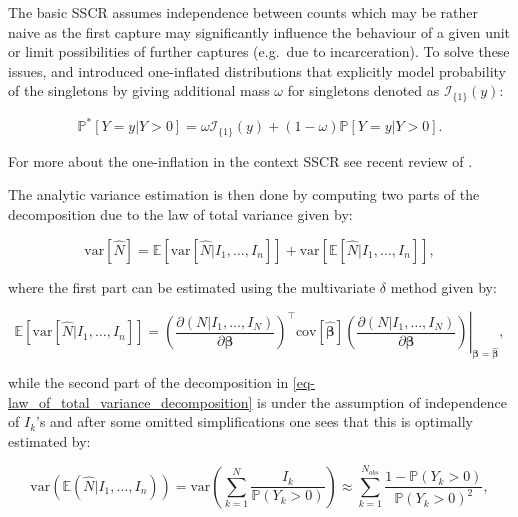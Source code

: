 \documentclass[
]{jss}
\newcommand{\1}{\mathcal{I}} \newcommand{\bZero}{\boldsymbol{0}}
\begin{document}
The basic SSCR assumes independence between counts which may be rather
naive as the first capture may significantly influence the behaviour of
a given unit or limit possibilities of further captures (e.g.~due to
incarceration). To solve these issues, \citet{godwin2017estimation} and
\citet{ztoi-oizt-poisson} introduced one-inflated distributions that
explicitly model probability of the singletons by giving additional mass
\(\omega\) for singletons denoted as \(\mathcal{I}_{\{1\}}(y)\):

\begin{equation*}
  \mathbb{P}^{\ast}[Y=y|Y>0] =
  \omega\mathcal{I}_{\{1\}}(y)+(1-\omega)\mathbb{P}[Y=y|Y>0].
\end{equation*}

For more about the one-inflation in the context SSCR see recent review
of \citet{bohning2024one}.

The analytic variance estimation is then done by computing two parts of
the decomposition due to the law of total variance given by:

\begin{equation}\label{eq-law_of_total_variance_decomposition}
  \text{var}[\hat{N}] = \mathbb{E}\left[\text{var}
  \left[\hat{N}|I_{1},\dots,I_{n}\right]\right] + 
  \text{var}\left[\mathbb{E}[\hat{N}|I_{1},\dots,I_{n}]\right],
\end{equation}

where the first part can be estimated using the multivariate \(\delta\)
method given by:

\begin{equation*}
  \mathbb{E}\left[\text{var} \left[\hat{N}|I_{1},\dots,I_{n}\right]\right] =
  \left.\left(\frac{\partial(N|I_1,\dots,I_N)}{\partial\boldsymbol{\beta}}\right)^\top
  \text{cov}\left[\hat{\boldsymbol{\beta}}\right]
  \left(\frac{\partial(N|I_1,\dots,I_N)}{\partial\boldsymbol{\beta}}\right)
  \right|_{\boldsymbol{\beta}=\hat{\boldsymbol{\beta}}},
\end{equation*}

while the second part of the decomposition in
\eqref{eq-law_of_total_variance_decomposition} is under the assumption
of independence of \(I_{k}\)'s and after some omitted simplifications
one sees that this is optimally estimated by:

\begin{equation*}
  \text{var}\left(\mathbb{E}(\hat{N}|I_{1},\dots,I_{n})\right) =
  \text{var}\left(\sum_{k=1}^{N}\frac{I_{k}}{\mathbb{P}(Y_{k}>0)}\right)
  \approx\sum_{k=1}^{N_{obs}}\frac{1-\mathbb{P}(Y_{k}>0)}{\mathbb{P}(Y_{k}>0)^{2}},
\end{equation*}
\end{document}
